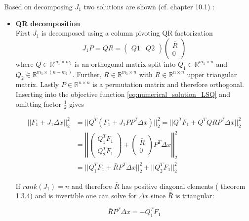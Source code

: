 \documentclass{scrartcl}[12pt, halfparskip]
\numberwithin{equation}{section}
\numberwithin{figure}{section}
\numberwithin{table}{section}
\begin{document}
Based on decomposing $J_1$ two solutions are shown (cf. \cite{nonlinear_optimiziation_wright} chapter 10.1) :

\begin{itemize}
	\item \textbf{QR decomposition} \\
	First $J_1$ is decomposed using a column pivoting QR factorization
	\begin{equation}
		J_1 P = Q R = 
		\begin{pmatrix}
			Q1 & Q2
		\end{pmatrix}
		\begin{pmatrix}
			\bar{R} \\
			0
		\end{pmatrix}
	\end{equation}
	where $Q \in \mathbb{R}^{m_1 \times m_1}$ is an orthogonal matrix split into $Q_1 \in \mathbb{R}^{m_1 \times n}$ and $Q_2 \in \mathbb{R}^{m_1 \times (n-m_1)}$. Further, $R \in \mathbb{R}^{m_1 \times n}$ with $\bar{R} \in \mathbb{R}^{n \times n}$ upper triangular matrix. Lastly $P \in \mathbb{R}^{n \times n}$ is a permutation matrix and therefore orthogonal. Inserting into the objective function \cref{eq:numerical_solution_LSQ} and omitting factor $\frac{1}{2}$ gives
	
	\begin{align}
		|| F_1 + J_1 \Delta x ||_2^2 & = || Q^T (F_1 + J_1 P P^T \Delta x) ||_2^2 = || Q^T F_1 + Q^T Q R P^T \Delta x ||_2^2 \\
		& = \left| \left| \begin{pmatrix}
		Q_1^T F_1 \\
		Q_2^T F_1
		\end{pmatrix} + 
		\begin{pmatrix}
		\bar{R} \\
		0
		\end{pmatrix}
		P^T \Delta x \right| \right|_2^2 \nonumber \\
		& = || Q_1^T F_1 + \bar{R} P^T \Delta x ||_2^2 + ||Q_2^T F_1 ||_2^2 \nonumber
	\end{align}
	
	If $rank(J_1)=n$ and therefore $\bar{R}$ has positive diagonal elements (\cite{numerical_methods_lsq_Bjorck} theorem 1.3.4) and is invertible  one can solve for $\Delta x$ since $\bar{R}$ is triangular:
	
	\begin{equation}
		\bar{R} P^T \Delta x = -Q_1^T F_1
	\end{equation}
	

\end{itemize}
\end{document}
